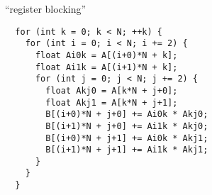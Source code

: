 

\begin{frame}[fragile,label=registerBlocking]{``register blocking''}
\lstset{
    style=small,
    language=C
}
\begin{lstlisting}
  for (int k = 0; k < N; ++k) {
    for (int i = 0; i < N; i += 2) {
      float Ai0k = A[(i+0)*N + k];
      float Ai1k = A[(i+1)*N + k];
      for (int j = 0; j < N; j += 2) {
        float Akj0 = A[k*N + j+0];
        float Akj1 = A[k*N + j+1];
        B[(i+0)*N + j+0] += Ai0k * Akj0;
        B[(i+1)*N + j+0] += Ai1k * Akj0;
        B[(i+0)*N + j+1] += Ai0k * Akj1;
        B[(i+1)*N + j+1] += Ai1k * Akj1;
      }
    }
  }
\end{lstlisting}
\end{frame}

